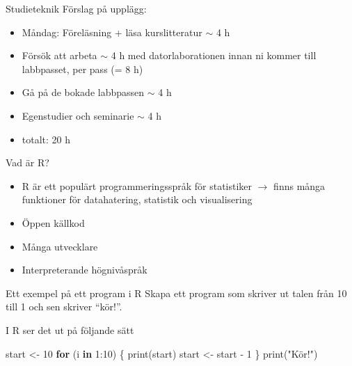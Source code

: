 \documentclass[
  10pt,
  ignorenonframetext,
]{beamer}
\newenvironment{Shaded}{\begin{snugshade}}{\end{snugshade}}
\newcommand{\ControlFlowTok}[1]{\textcolor[rgb]{0.13,0.29,0.53}{\textbf{#1}}}
\newcommand{\DecValTok}[1]{\textcolor[rgb]{0.00,0.00,0.81}{#1}}
\newcommand{\FunctionTok}[1]{\textcolor[rgb]{0.00,0.00,0.00}{#1}}
\newcommand{\NormalTok}[1]{#1}
\newcommand{\OtherTok}[1]{\textcolor[rgb]{0.56,0.35,0.01}{#1}}
\newcommand{\SpecialCharTok}[1]{\textcolor[rgb]{0.00,0.00,0.00}{#1}}
\newcommand{\StringTok}[1]{\textcolor[rgb]{0.31,0.60,0.02}{#1}}
\providecommand{\tightlist}{%
  \setlength{\itemsep}{0pt}\setlength{\parskip}{0pt}}
\begin{document}
\begin{frame}{Studieteknik}
\protect\hypertarget{datorlaborationer}{}
Förslag på upplägg:
\begin{itemize}[<+->]
\tightlist
  \item Måndag: Föreläsning + läsa kurslitteratur $\sim$ 4 h
  \item Försök att arbeta $\sim$ 4 h med datorlaborationen innan ni kommer till labbpasset, per pass (= 8 h)
  \item Gå på de bokade labbpassen $\sim$ 4 h
  \item Egenstudier och seminarie $\sim$ 4 h
  \item totalt: 20 h
\end{itemize}
\end{frame}



\begin{frame}{Vad är R?}
\protect\hypertarget{vad-uxe4r-r}{}
\begin{itemize}[<+->]
\tightlist
\item
  R är ett populärt programmeringsspråk för statistiker $\rightarrow$ finns många funktioner för datahatering, statistik och visualisering  
\item
  Öppen källkod
\item
  Många utvecklare 
\item
  Interpreterande högnivåspråk
\end{itemize}
\end{frame}


\begin{frame}[fragile]{Ett exempel på ett program i R}
\protect\hypertarget{ett-exempel-puxe5-ett-program-i-r}{}
Skapa ett program som skriver ut talen från 10 till 1 och sen skriver
``kör!''.

\pause

I R ser det ut på följande sätt

\begin{Shaded}
\begin{Highlighting}[]
\NormalTok{start }\OtherTok{\textless{}{-}} \DecValTok{10}
\ControlFlowTok{for}\NormalTok{ (i }\ControlFlowTok{in} \DecValTok{1}\SpecialCharTok{:}\DecValTok{10}\NormalTok{) \{}
  \FunctionTok{print}\NormalTok{(start)}
\NormalTok{  start }\OtherTok{\textless{}{-}}\NormalTok{ start }\SpecialCharTok{{-}} \DecValTok{1}
\NormalTok{\}}
\FunctionTok{print}\NormalTok{(}\StringTok{"Kör!"}\NormalTok{)}
\end{Highlighting}
\end{Shaded}
\end{frame}
\end{document}
